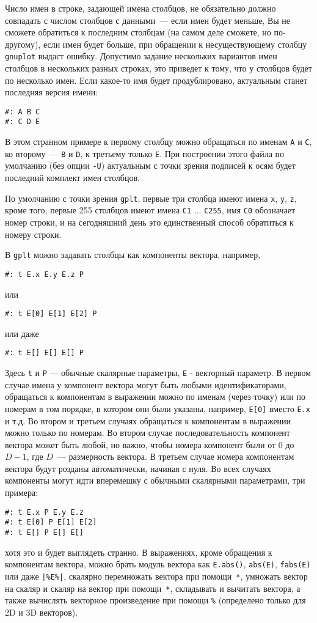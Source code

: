 \documentclass[12pt]{article}
\def\gplt{{\tt gplt}}
\def\gnuplot{{\tt gnuplot}}
\begin{document}
Число имен в строке, задающей имена столбцов, не обязательно должно совпадать с числом столбцов с данными~--- если имен будет меньше, Вы не сможете обратиться к
последним столбцам (на самом деле сможете, но по-другому), если имен будет больше, при обращении к несуществующему столбцу \gnuplot{} выдаст ошибку.
Допустимо задание нескольких вариантов имен столбцов в нескольких разных строках, это приведет к тому, что у столбцов будет по несколько имен.
Если какое-то имя будет продублировано, актуальным станет последняя версия имени:
\begin{verbatim}
#: A B C
#: C D E
\end{verbatim}
В этом странном примере к первому столбцу можно обращаться по именам \verb'A' и \verb'C', ко второму~--- \verb'B' и \verb'D', к третьему только \verb'E'.
При построении этого файла по умолчанию (без опции \verb'-U') актуальным с точки зрения подписей к осям будет последний комплект имен столбцов. 

По умолчанию с точки зрения \gplt, первые три столбца имеют имена \verb'x', \verb'y', \verb'z', кроме того, первые 255 столбцов имеют имена \verb'C1' ... \verb'C255',
имя \verb'C0' обозначает номер строки, и на сегодняшний день это единственный способ обратиться к номеру строки. 

В \gplt{} можно задавать столбцы как компоненты вектора, например,
\begin{verbatim}
#: t E.x E.y E.z P 
\end{verbatim}
или
\begin{verbatim}
#: t E[0] E[1] E[2] P 
\end{verbatim}
или даже
\begin{verbatim}
#: t E[] E[] E[] P 
\end{verbatim}
Здесь \verb't' и \verb'P' --- обычные скалярные параметры, \verb'E' - векторный параметр.
В первом случае имена у компонент вектора могут быть любыми идентификаторами, обращаться к компонентам в выражении можно
по именам (через точку) или по номерам в том порядке, в котором они были указаны, например, \verb'E[0]' вместо \verb'E.x' и т.д.
Во втором и третьем случаях обращаться к компонентам в выражении можно только по номерам.
Во втором случае последовательность компонент
 вектора может быть любой, но важно, чтобы номера компонент были от $0$ до $D-1$, где $D$~--- размерность вектора. В третьем случае
 номера компонентам вектора будут розданы автоматически, начиная с нуля.
Во всех случаях компоненты могут идти вперемешку с обычными скалярными параметрами, три примера:
\begin{verbatim}
#: t E.x P E.y E.z  
#: t E[0] P E[1] E[2]
#: t E[] P E[] E[]  
\end{verbatim}
хотя это и будет выглядеть странно.
В выражениях, кроме обращения к компонентам вектора, можно брать модуль вектора как \verb'E.abs()', \verb'abs(E)',  \verb'fabs(E)' или даже  \verb'|%E%|',
скалярно перемножать вектора при помощи~\verb'*',
умножать вектор на скаляр и скаляр на вектор при помощи~\verb'*', складывать и вычитать вектора, а также вычислять векторное произведение при помощи \verb'%'
(определено только для 2D и 3D векторов).
\end{document}
